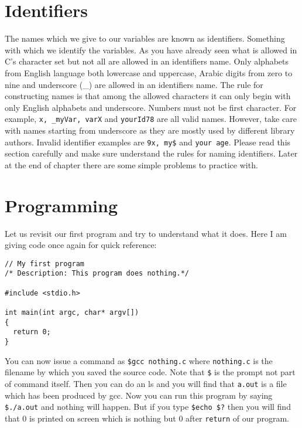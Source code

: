 \section{Identifiers}
The names which we give to our variables are known as identifiers. Something 
with which we identify the variables. As you have already seen what is allowed 
in C's character set but not all are allowed in an identifiers name. Only 
alphabets from English language both lowercase and uppercase, Arabic digits from 
zero to nine and underscore (\_) are allowed in an identifiers name. The rule 
for constructing names is that among the allowed characters it can only begin 
with only English alphabets and underscore. Numbers must not be first character. 
For example, \texttt{x, \_myVar, varX} and \texttt{yourId78} are all valid 
names. However, take care with names starting from underscore as they are mostly 
used by different library authors. Invalid identifier examples are \texttt{9x, 
my\$} and \texttt{your age}. Please read this section carefully and make sure 
understand the rules for naming identifiers. Later at the end of chapter there 
are some simple problems to practice with.

\section{Programming}
Let us revisit our first program and try to understand what it does. Here I am 
giving code once again for quick reference:

\begin{verbatim}
// My first program
/* Description: This program does nothing.*/

#include <stdio.h>

int main(int argc, char* argv[])
{
  return 0;
}
\end{verbatim}

You can now issue a command as \texttt{\$gcc nothing.c} where 
\texttt{nothing.c} is the filename by which you saved the source code. Note 
that \texttt{\$} is the prompt not part of command itself. Then you can do an 
ls and you will find that \texttt{a.out} is a file which has been produced by 
gcc. Now you can run this program by saying \texttt{\$./a.out} and nothing 
will happen. But if you type \texttt{\$echo \$?} then you will find that 0 is 
printed on screen which is nothing but 0 after \texttt{return} of our program.

